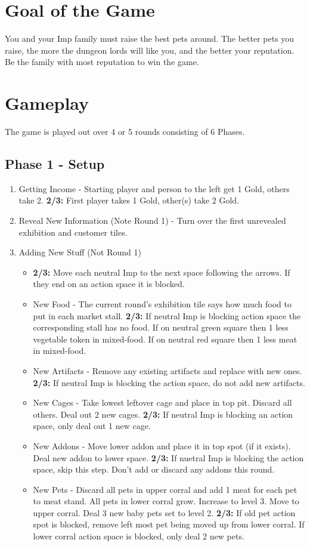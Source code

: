 \documentclass[12pt]{article}
\newenvironment{enumerateCustom}
{\begin{enumerate}
  \setlength{\itemsep}{1pt}
  \setlength{\parskip}{0pt}
  \setlength{\parsep}{0pt}}
{\end{enumerate}}
\newenvironment{itemizeCustom}
{\begin{itemize}
  \setlength{\itemsep}{1pt}
  \setlength{\parskip}{0pt}
  \setlength{\parsep}{0pt}}
{\end{itemize}}
\begin{document}
\begin{multicols*}{2}
\section*{Goal of the Game}
You and your Imp family must raise the best pets around. The better pets you raise, the more the dungeon lords will like you, and the better your reputation. Be the family with most reputation to win the game.

\section*{Gameplay}
The game is played out over 4 or 5 rounds consisting of 6 Phases.

\subsection*{Phase 1 - Setup}
\begin{enumerateCustom}
	\item Getting Income - Starting player and person to the left get 1 Gold, others take 2. \textbf{2/3:} First player takes 1 Gold, other(s) take 2 Gold.
	\item Reveal New Information (Note Round 1) - Turn over the first unrevealed exhibition and customer tiles.
	\item Adding New Stuff (Not Round 1)
		\begin{itemizeCustom}
			\item \textbf{2/3:} Move each neutral Imp to the next space following the arrows. If they end on an action space it is blocked.
			\item New Food - The current round's exhibition tile says how much food to put in each market stall. \textbf{2/3: } If neutral Imp is blocking action space the corresponding stall has no food. If on neutral green square then 1 less vegetable token in mixed-food. If on neutral red square then 1 less meat in mixed-food.
			\item New Artifacts - Remove any existing artifacts and replace with new ones. \textbf{2/3:} If neutral Imp is blocking the action space, do not add new artifacts.
			\item New Cages - Take lowest leftover cage and place in top pit. Discard all others. Deal out 2 new cages. \textbf{2/3:} If neutral Imp is blocking an action space, only deal out 1 new cage.
			\item New Addons - Move lower addon and place it in top spot (if it exists). Deal new addon to lower space. \textbf{2/3:} If nuetral Imp is blocking the action space, skip this step. Don't add or discard any addons this round.
			\item New Pets - Discard all pets in upper corral and add 1 meat for each pet to meat stand. All pets in lower corral grow. Increase to level 3. Move to upper corral. Deal 3 new baby pets set to level 2. \textbf{2/3:} If old pet action spot is blocked, remove left most pet being moved up from lower corral. If lower corral action space is blocked, only deal 2 new pets.
		\end{itemizeCustom}
\end{enumerateCustom}


\end{multicols*}
\end{document}

